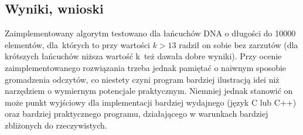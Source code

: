 \documentclass{article}
\begin{document}
\subsection{Wyniki, wnioski}
Zaimplementowany algorytm testowano dla łańcuchów DNA o długości do 10000 elementów, dla~których to przy wartości $k > 13$ radził on sobie bez zarzutów (dla krótszych łańcuchów niższa wartość k~też dawała dobre wyniki). Przy ocenie zaimplementowanego rozwiązania trzeba jednak pamiętać o naiwnym sposobie gromadzenia odczytów, co niestety czyni program bardziej ilustracją idei niż narzędziem o wymiernym potencjale praktycznym.
Niemniej jednak stanowić on może punkt wyjściowy dla implementacji bardziej wydajnego (język C lub C++) oraz bardziej praktycznego programu, działającego w warunkach bardziej zbliżonych do rzeczywistych.
\end{document}
